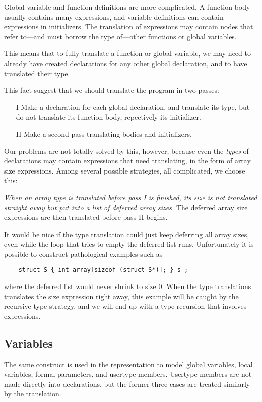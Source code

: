 \begin{docpart}
Global variable and function definitions are more complicated. A function
body usually contains many expressions, and variable definitions can contain
expressions in initializers. The translation of expressions may
contain  nodes that refer to---and must borrow the \coreC type
of---other functions or global variables.

This means that to fully translate a function or global variable, we
may need to already have created \coreC declarations for any other
global declaration, and to have translated their type.

This fact suggest that we should translate the program in two passes:
\begin{itemize}
\item[I] Make a \coreC declaration for each global declaration, and
        translate its type, but do not translate its function body,
        repectively its initializer.
\item[II] Make a second pass translating bodies and initializers.
\end{itemize}

Our problems are not totally solved by this, however, because even
the \emph{types} of declarations may contain expressions that need
translating, in the form of array size expressions. Among several
possible strategies, all complicated, we choose this:

\emph{When an array type is translated before pass I is finished, its
size is \emph{not} translated straight away but put into a list of
deferred array sizes.} The deferred array size expressions are then
translated before pass II begins.

It would be nice if the type translation could just keep deferring
all array sizes, even while the loop that tries to empty the deferred
list runs. Unfortunately it is possible to construct pathological
examples such as
\begin{verbatim}
    struct S { int array[sizeof (struct S*)]; } s ;
\end{verbatim}
where the deferred list would never shrink to size 0. When the type
translations translates the size expression right away, this
example will be caught by the recursive type strategy, and we will
end up with a type recursion that involves expressions.

\subsection{Variables}
\label{sec:c2coreVariables}
The same construct is used in the \ansiC representation to model
global variables, local variables, formal parameters, and usertype
members. Usertype members are not made directly into \coreC
declarations, but the former three cases are treated similarly
by the \ctoc translation.


\end{docpart}
